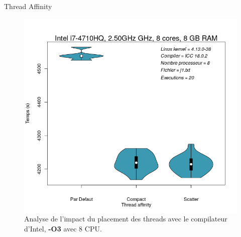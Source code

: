 \documentclass{beamer}
\begin{document}
\begin{frame}{Thread Affinity}
	\begin{figure}
	\begin{columns}
      \caption{Analyse de l'impact du placement des threads avec le compilateur d'Intel, \textbf{-O3} avec 8 CPU.\label{Fig:thread_affinity}}
      \includegraphics[width=\textwidth]{defaultVSscatterVScompact.png}
    \end{columns}	
	\end{figure}
\end{frame}
\end{document}
